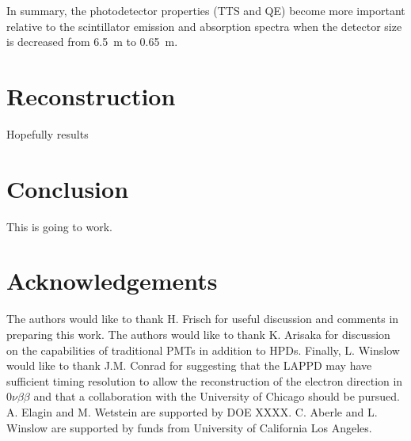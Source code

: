\documentclass[aps,prc,twocolumn,groupedaddress,showpacs,amsmath,amssymb,floatfix,superscriptaddress]{revtex4}
\begin{document}

In summary, the photodetector properties (TTS and QE) become more important relative to the scintillator emission and absorption spectra when the detector size is decreased from 6.5~m to 0.65~m.


\section{Reconstruction}
\label{reconstruction_sec}
Hopefully results

\section{Conclusion}
This is going to work.

\section{Acknowledgements}
The authors would like to thank H. Frisch for useful discussion and comments in preparing this work. The authors would like to thank K. Arisaka for discussion on the capabilities of traditional PMTs in addition to HPDs. Finally, L. Winslow would like to thank J.M. Conrad for suggesting that the LAPPD may have sufficient timing resolution to allow the reconstruction of the electron direction in $0\nu\beta\beta$ and that a collaboration with the University of Chicago should be pursued.  A. Elagin and M. Wetstein are supported by DOE XXXX. C. Aberle and L. Winslow are supported by funds from University of California Los Angeles.



\end{document}
